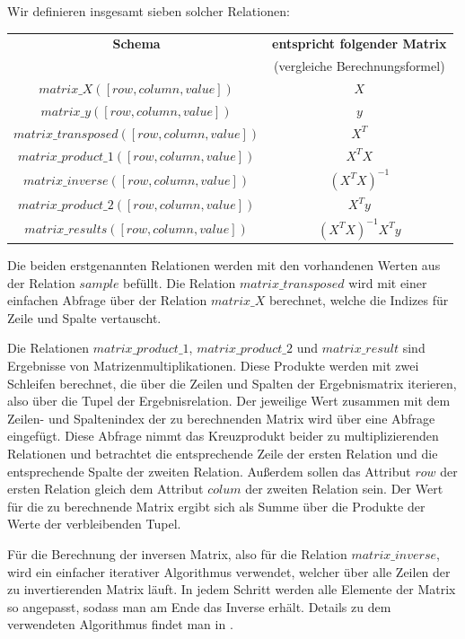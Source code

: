 Wir definieren insgesamt sieben solcher Relationen:
\begin{center}
  \begin{tabular}{|c|c|}\hline
    \textbf{Schema} & \textbf{entspricht folgender Matrix} \\
     &  (vergleiche Berechnungsformel) \\ \hline
    $matrix\_X([row, column, value])$ & $X$ \\ \hline
    $matrix\_y([row, column, value])$ & $y$ \\ \hline
    $matrix\_transposed([row, column, value])$ & $X^T$ \\ \hline
    $matrix\_product\_1([row, column, value])$ & $X^T X$ \\ \hline
    $matrix\_inverse([row, column, value])$ & $(X^T X)^{-1}$ \\ \hline
    $matrix\_product\_2([row, column, value])$ & $X^T y$ \\ \hline
    $matrix\_results([row, column, value])$ & $(X^T X)^{-1} X^T y$ \\ \hline
  \end{tabular}
\end{center}

Die beiden erstgenannten Relationen werden mit den vorhandenen Werten aus der Relation $sample$ befüllt. Die Relation $matrix\_transposed$ wird mit einer einfachen Abfrage über der Relation $matrix\_X$ berechnet, welche die Indizes für Zeile und Spalte vertauscht.

Die Relationen $matrix\_product\_1$, $matrix\_product\_2$ und $matrix\_result$ sind Ergebnisse von Matrizenmultiplikationen. Diese Produkte werden mit zwei Schleifen berechnet, die über die Zeilen und Spalten der Ergebnismatrix iterieren, also über die Tupel der Ergebnisrelation. Der jeweilige Wert zusammen mit dem Zeilen- und Spaltenindex der zu berechnenden Matrix wird über eine Abfrage eingefügt. Diese Abfrage nimmt das Kreuzprodukt beider zu multiplizierenden Relationen und betrachtet die entsprechende Zeile der ersten Relation und die entsprechende Spalte der zweiten Relation. Außerdem sollen das Attribut $row$ der ersten Relation gleich dem Attribut $colum$ der zweiten Relation sein. Der Wert für die zu berechnende Matrix ergibt sich als Summe über die Produkte der Werte der verbleibenden Tupel.

Für die Berechnung der inversen Matrix, also für die Relation $matrix\_inverse$, wird ein einfacher iterativer Algorithmus verwendet, welcher über alle Zeilen der zu invertierenden Matrix läuft. In jedem Schritt werden alle Elemente der Matrix so angepasst, sodass man am Ende das Inverse erhält. Details zu dem verwendeten Algorithmus findet man in \cite{matrix}.

